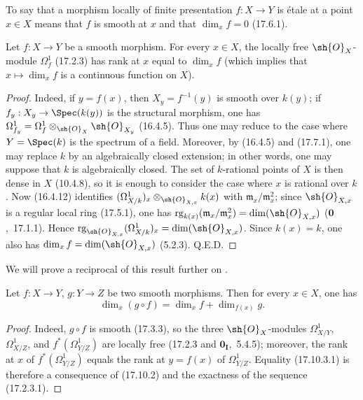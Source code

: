 To say that a morphism locally of finite presentation $f:X\to Y$ is \'etale at a point $x\in X$ means that $f$ is smooth at $x$ and that $\dim_x f=0$ (17.6.1).

\begin{proposition}[17.10.2]
\label{IV.17.10.2}
Let $f:X\to Y$ be a smooth morphism.
For every $x\in X$, the locally free $\sh{O}_X$-module $\Omega^1_f$ (17.2.3) has rank at $x$ equal to $\dim_x f$ (which implies that $x\mapsto\dim_x f$ is a continuous function on $X$).
\end{proposition}

\begin{proof}
Indeed, if $y=f(x)$, then $X_y=f^{-1}(y)$ is smooth over $k(y)$; if $f_y:X_y\to\Spec(k(y))$ is the structural morphism, one has $\Omega^1_{f_y}=\Omega^1_f\otimes_{\sh{O}_X}\sh{O}_{X_y}$ (16.4.5).
Thus one may reduce to the case where $Y=\Spec(k)$ is the spectrum of a field.
Moreover, by (16.4.5) and (17.7.1), one may replace $k$ by an algebraically closed extension; in other words, one may suppose that $k$ is algebraically closed.
The set of $k$-rational points of $X$ is then dense in $X$ (10.4.8), so it is enough to consider the case where $x$ is rational over $k$.
Now (16.4.12) identifies $(\Omega^1_{X/k})_x\otimes_{\sh{O}_{X,x}}k(x)$ with $\mathfrak{m}_x/\mathfrak{m}_x^2$; since $\sh{O}_{X,x}$ is a regular local ring (17.5.1), one has $\operatorname{rg}_{k(x)}(\mathfrak{m}_x/\mathfrak{m}_x^2)=\dim(\sh{O}_{X,x})$ ($\mathbf{0}$,~17.1.1).
Hence $\operatorname{rg}_{\sh{O}_{X,x}}(\Omega^1_{X/k})_x=\dim(\sh{O}_{X,x})$.
Since $k(x)=k$, one also has $\dim_x f=\dim(\sh{O}_{X,x})$ (5.2.3).
Q.E.D.
\end{proof}

We will prove a reciprocal of this result further on .


\begin{corollary}[17.10.3]
\label{IV.17.10.3}
Let $f:X\to Y$, $g:Y\to Z$ be two smooth morphisms.
Then for every $x\in X$, one has
\[
\tag{17.10.3.1}
\dim_x(g\circ f) = \dim_x f + \dim_{f(x)} g.
\]
\end{corollary}

\begin{proof}
Indeed, $g\circ f$ is smooth (17.3.3), so the three $\sh{O}_X$-modules $\Omega^1_{X/Y}$, $\Omega^1_{X/Z}$, and $f^*(\Omega^1_{Y/Z})$ are locally free (17.2.3 and $\mathbf{0}_\mathbf{I}$,~5.4.5); moreover, the rank at $x$ of $f^*(\Omega^1_{Y/Z})$ equals the rank at $y=f(x)$ of $\Omega^1_{Y/Z}$.
Equality (17.10.3.1) is therefore a consequence of (17.10.2) and the exactness of the sequence (17.2.3.1).
\end{proof}

